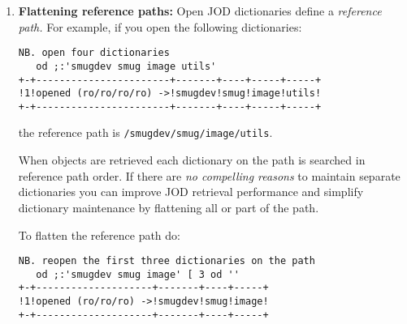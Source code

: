 \begin{enumerate}
\item
  \textbf{Flattening reference paths:} Open JOD dictionaries define a
  \emph{reference path.} For example, if you open the following
  dictionaries:
  
%
%
%

\begin{tcolorbox}[breakable, size=fbox, boxrule=1pt, pad at break*=1mm,colback=cellbackground, colframe=cellborder]
\begin{lstlisting}[language=jdoc,escapechar=*,frame=single,framerule=0pt,label=lst:scr5077X1]
   NB. open four dictionaries   
   od ;:'smugdev smug image utils'
+-+-----------------------+-------+----+-----+-----+
!1!opened (ro/ro/ro/ro) ->!smugdev!smug!image!utils!
+-+-----------------------+-------+----+-----+-----+
\end{lstlisting}
\end{tcolorbox}

  the reference path is \texttt{/smugdev/smug/image/utils}.

  When objects are retrieved each dictionary on the path is searched in
  reference path order. If there are \emph{no compelling reasons} to
  maintain separate dictionaries you can improve JOD retrieval
  performance and simplify dictionary maintenance by flattening all or
  part of the path.

  To flatten the reference path do:
\begin{tcolorbox}[breakable, size=fbox, boxrule=1pt, pad at break*=1mm,colback=cellbackground, colframe=cellborder]
\begin{lstlisting}[language=jdoc, frame=single,framerule=0pt,label=lst:scr5077X2]
   NB. reopen the first three dictionaries on the path   
   od ;:'smugdev smug image' [ 3 od ''
+-+--------------------+-------+----+-----+
!1!opened (ro/ro/ro) ->!smugdev!smug!image!
+-+--------------------+-------+----+-----+


\end{lstlisting}
\end{tcolorbox}
\end{enumerate}
